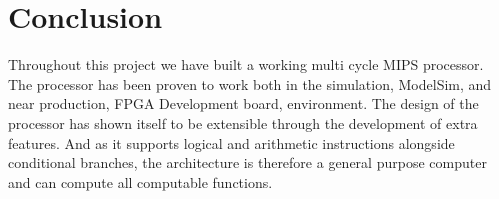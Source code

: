 \section{Conclusion}

Throughout this project we have built a working multi cycle MIPS processor. The processor
has been proven to work both in the simulation, ModelSim, and near production, FPGA Development board, environment.
The design of the processor has shown itself to be extensible through the development of extra
features. And as it supports logical and arithmetic instructions alongside conditional branches, 
the architecture is therefore a general purpose computer and can compute all computable functions. 
